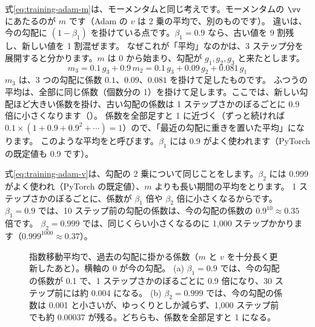 式\eqref{eq:training-adam-m}は、モーメンタムと同じ考えです。モーメンタムの $\vv$ にあたるのが $m$ です（Adam の $v$ は 2 乗の平均で、別のものです）。
違いは、今の勾配に $(1-\beta_1)$ を掛けている点です。$\beta_1=0.9$ なら、古い値を 9 割残し、新しい値を 1 割混ぜます。
なぜこれが「平均」なのかは、3 ステップ分を展開すると分かります。$m$ は 0 から始まり、勾配が $g_1, g_2, g_3$ と来たとします。
\[ m_3=0.1\,g_3+0.9\,m_2=0.1\,g_3+0.09\,g_2+0.081\,g_1 \]
$m_3$ は、3 つの勾配に係数 $0.1$、$0.09$、$0.081$ を掛けて足したものです。
ふつうの平均は、全部に同じ係数（個数分の 1）を掛けて足します。ここでは、新しい勾配ほど大きい係数を掛け、古い勾配の係数は 1 ステップさかのぼるごとに 0.9 倍に小さくなります（）。
係数を全部足すと 1 に近づく（ずっと続ければ $0.1\times(1+0.9+0.9^2+\cdots)=1$）ので、「最近の勾配に重きを置いた平均」になります。
このような平均をと呼びます。$\beta_1$ には 0.9 がよく使われます（PyTorch の既定値も 0.9 です）。

式\eqref{eq:training-adam-v}は、勾配の 2 乗について同じことをします。$\beta_2$ には 0.999 がよく使われ（PyTorch の既定値）、$m$ よりも長い期間の平均をとります。
1 ステップさかのぼるごとに、係数が $\beta_1$ 倍や $\beta_2$ 倍に小さくなるからです。
$\beta_1=0.9$ では、10 ステップ前の勾配の係数は、今の勾配の係数の $0.9^{10}\approx0.35$ 倍です。
$\beta_2=0.999$ では、同じくらい小さくなるのに 1,000 ステップかかります（$0.999^{1000}\approx0.37$）。

\begin{figure}[tbp]
\centering
{}
\caption{指数移動平均で、過去の勾配に掛かる係数（$m$ と $v$ を十分長く更新したあと）。横軸の 0 が今の勾配。
(a) $\beta_1=0.9$ では、今の勾配の係数が 0.1 で、1 ステップさかのぼるごとに 0.9 倍になり、30 ステップ前には約 0.004 になる。
(b) $\beta_2=0.999$ では、今の勾配の係数は 0.001 と小さいが、ゆっくりとしか減らず、1,000 ステップ前でも約 0.00037 が残る。どちらも、係数を全部足すと 1 になる。}
\label{fig:training-ema}
\end{figure}


